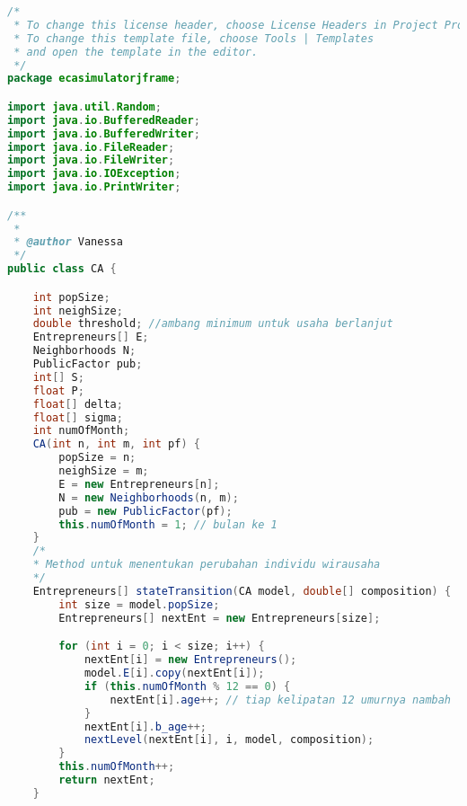 \begin{lstlisting}[language=Java, caption=CA.java]
/*
 * To change this license header, choose License Headers in Project Properties.
 * To change this template file, choose Tools | Templates
 * and open the template in the editor.
 */
package ecasimulatorjframe;

import java.util.Random;
import java.io.BufferedReader;
import java.io.BufferedWriter;
import java.io.FileReader;
import java.io.FileWriter;
import java.io.IOException;
import java.io.PrintWriter;

/**
 *
 * @author Vanessa
 */
public class CA {

    int popSize;
    int neighSize;
    double threshold; //ambang minimum untuk usaha berlanjut
    Entrepreneurs[] E;
    Neighborhoods N;
    PublicFactor pub;
    int[] S; 
    float P;
    float[] delta;
    float[] sigma;
    int numOfMonth;
    CA(int n, int m, int pf) {
        popSize = n;
        neighSize = m;
        E = new Entrepreneurs[n];
        N = new Neighborhoods(n, m);
        pub = new PublicFactor(pf);
        this.numOfMonth = 1; // bulan ke 1
    }
    /*
    * Method untuk menentukan perubahan individu wirausaha
    */
    Entrepreneurs[] stateTransition(CA model, double[] composition) {
        int size = model.popSize;
        Entrepreneurs[] nextEnt = new Entrepreneurs[size];

        for (int i = 0; i < size; i++) {
            nextEnt[i] = new Entrepreneurs();
            model.E[i].copy(nextEnt[i]);
            if (this.numOfMonth % 12 == 0) {
                nextEnt[i].age++; // tiap kelipatan 12 umurnya nambah
            }
            nextEnt[i].b_age++;
            nextLevel(nextEnt[i], i, model, composition);
        }
        this.numOfMonth++;
        return nextEnt;
    }


\end{lstlisting}
